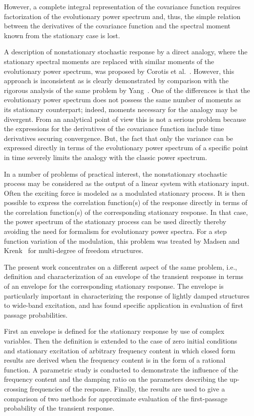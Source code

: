 \documentclass[12pt]{article}
\begin{document}
However, a complete integral representation of the covariance function requires factorization of the evolutionary power spectrum and, thus, the simple relation between the derivatives of the covariance function and the spectral moment known from the stationary case is lost.

A description of nonstationary stochastic response by a direct analogy, where the stationary spectral moments are replaced with similar moments of the evolutionary power spectrum, was proposed by Corotis et al.~\cite{corotis1972}. However, this approach is inconsistent as is clearly demonstrated by comparison with the rigorous analysis of the same problem by Yang~\cite{yang1972}. One of the differences is that the evolutionary power spectrum does not possess the same number of moments as its stationary counterpart; indeed, moments necessary for the analogy may be divergent. From an analytical point of view this is not a serious problem because the expressions for the derivatives of the covariance function include time derivatives securing convergence. But, the fact that only the variance can be expressed directly in terms of the evolutionary power spectrum of a specific point in time severely limits the analogy with the classic power spectrum.

In a number of problems of practical interest, the nonstationary stochastic process may be considered as the output of a linear system with stationary input. Often the exciting force is modeled as a modulated stationary process. It is then possible to express the correlation function(s) of the response directly in terms of the correlation function(s) of the corresponding stationary response. In that case, the power spectrum of the stationary process can be used directly thereby avoiding the need for formalism for evolutionary power spectra. For a step function variation of the modulation, this problem was treated by Madsen and Krenk~\cite{madsen1982} for multi-degree of freedom structures.

The present work concentrates on a different aspect of the same problem, i.e., definition and characterization of an envelope of the transient response in terms of an envelope for the corresponding stationary response. The envelope is particularly important in characterizing the response of lightly damped structures to wide-band excitation, and has found specific application in evaluation of first passage probabilities.

First an envelope is defined for the stationary response by use of complex variables. Then the definition is extended to the case of zero initial conditions and stationary excitation of arbitrary frequency content in which closed form results are derived when the frequency content is in the form of a rational function. A parametric study is conducted to demonstrate the influence of the frequency content and the damping ratio on the parameters describing the up-crossing frequencies of the response. Finally, the results are used to give a comparison of two methods for approximate evaluation of the first-passage probability of the transient response.
\end{document}
